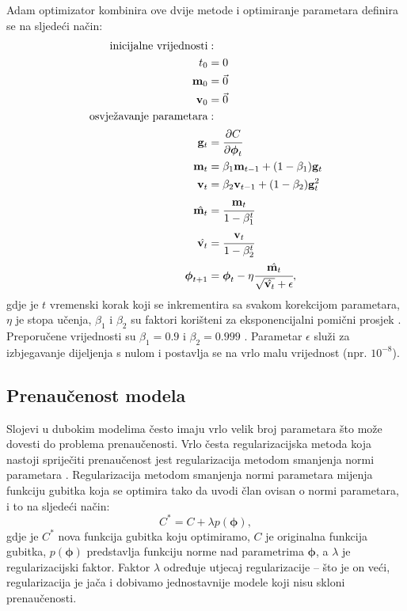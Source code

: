 \documentclass[times, utf8, diplomski, numeric]{fer}
\begin{document}
Adam optimizator kombinira ove dvije metode i optimiranje parametara definira se na sljedeći način:
\begin{align}
 \text{inicijalne vrijednosti}&: \nonumber \\
 t_0 &= 0 \nonumber \\
 \mathbf{m}_0 &= \vec{0} \nonumber \\
 \mathbf{v}_0 &= \vec{0} \nonumber  \\
 \text{osvježavanje parametara}&: \nonumber \\
 \mathbf{g}_t &= \cfrac{\partial C}{\partial \boldsymbol{\phi}_t}  \nonumber \\
 \mathbf{m}_t &= \beta_1 \mathbf{m}_{t-1} + (1 - \beta_1) \mathbf{g}_t \nonumber \\
 \mathbf{v}_t &= \beta_2 \mathbf{v}_{t-1} + (1 - \beta_2) \mathbf{g}_t^2 \nonumber \\
 \hat{\mathbf{m}_t} &= \cfrac{\mathbf{m}_t}{1 - \beta_1^t} \nonumber \\
 \hat{\mathbf{v}_t} &= \cfrac{\mathbf{v}_t}{1 - \beta_2^t} \nonumber \\
 \boldsymbol{\phi}_{t+1} &= \boldsymbol{\phi}_t - \eta \cfrac{\hat{\mathbf{m}_t}}{\sqrt{\hat{\mathbf{v}_t}} + \epsilon} \nonumber,
\end{align}
gdje je $t$ vremenski korak koji se inkrementira sa svakom korekcijom parametara, $\eta$ je stopa učenja, $\beta_1$ i $\beta_2$ su faktori korišteni za
eksponencijalni pomični prosjek . Preporučene vrijednosti su $\beta_1=0.9$ i $\beta_2=0.999$ \citep{article:adam}.
Parametar $\epsilon$ služi za izbjegavanje dijeljenja s nulom i postavlja se na vrlo malu vrijednost (npr. $10^{-8}$).


\subsection{Prenaučenost modela}

Slojevi u dubokim modelima često imaju vrlo velik broj parametara što može dovesti do problema prenaučenosti.
Vrlo česta regularizacijska metoda koja nastoji spriječiti prenaučenost jest regularizacija metodom smanjenja normi parametara .
Regularizacija metodom smanjenja normi parametara mijenja funkciju gubitka koja se optimira tako da uvodi član ovisan o normi parametara, i to na sljedeći način:
\begin{equation}
 C^* = C + \lambda p(\boldsymbol{\phi}),
\end{equation}
gdje je $C^*$ nova funkcija gubitka koju optimiramo, $C$ je originalna funkcija gubitka, $p(\boldsymbol{\phi})$ predstavlja funkciju norme nad parametrima $\boldsymbol{\phi}$, a $\lambda$ je regularizacijski faktor.
Faktor $\lambda$ određuje utjecaj regularizacije -- što je on veći, regularizacija je jača i dobivamo jednostavnije modele koji nisu skloni prenaučenosti.
\end{document}
